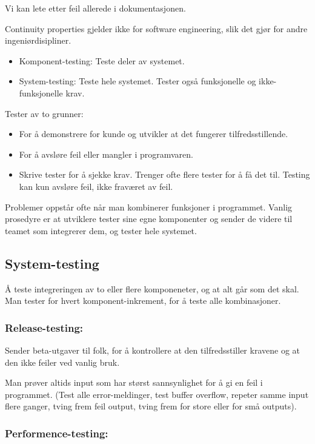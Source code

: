 \documentclass[11pt]{article}
\begin{document}
   Vi kan lete etter feil allerede i dokumentasjonen.
  
   Continuity properties gjelder ikke for software engineering, slik det gjør for andre ingeniørdisipliner.

\begin{itemize}
\item Komponent-testing: 
     Teste deler av systemet.
\item System-testing: 
     Teste hele systemet. Tester også funksjonelle og ikke-funksjonelle krav.
\end{itemize}

   Tester av to grunner: 
\begin{itemize}
\item For å demonstrere for kunde og utvikler at det fungerer tilfredsstillende.
\item For å avsløre feil eller mangler i programvaren.
\item Skrive tester for å sjekke krav. Trenger ofte flere tester for å få det til.
     Testing kan kun avsløre feil, ikke fraværet av feil.
\end{itemize}

   Problemer oppstår ofte når man kombinerer funksjoner i programmet.
   Vanlig prosedyre er at utviklere tester sine egne komponenter og sender de videre til teamet som integrerer dem, og tester hele systemet.
\subsection{System-testing}
\label{sec-9.2}


   Å teste integreringen av to eller flere komponeneter, og at alt går som det skal.
   Man tester for hvert komponent-inkrement, for å teste alle kombinasjoner.
\subsubsection{Release-testing:}
\label{sec-9.2.1}

    Sender beta-utgaver til folk, for å kontrollere at den tilfredsstiller kravene og at den ikke feiler ved vanlig bruk.

    Man prøver altids input som har størst sannsynlighet for å gi en feil i programmet. (Test alle error-meldinger, test buffer overflow, repeter samme input flere ganger, tving frem feil output, tving frem for store eller for små outputs).
\subsubsection{Performence-testing:}
\label{sec-9.2.2}
\end{document}
